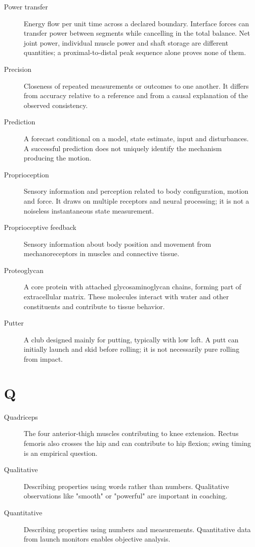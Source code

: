 \begin{description}
\item[Power transfer] Energy flow per unit time across a declared boundary. Interface forces can transfer power between segments while cancelling in the total balance. Net joint power, individual muscle power and shaft storage are different quantities; a proximal-to-distal peak sequence alone proves none of them.

\item[Precision] Closeness of repeated measurements or outcomes to one another. It differs from accuracy relative to a reference and from a causal explanation of the observed consistency.

\item[Prediction] A forecast conditional on a model, state estimate, input and disturbances. A successful prediction does not uniquely identify the mechanism producing the motion.

\item[Proprioception] Sensory information and perception related to body configuration, motion and force. It draws on multiple receptors and neural processing; it is not a noiseless instantaneous state measurement.

\item[Proprioceptive feedback] Sensory information about body position and movement from mechanoreceptors in muscles and connective tissue.

\item[Proteoglycan] A core protein with attached glycosaminoglycan chains, forming part of extracellular matrix. These molecules interact with water and other constituents and contribute to tissue behavior.

\item[Putter] A club designed mainly for putting, typically with low loft. A putt can initially launch and skid before rolling; it is not necessarily pure rolling from impact.

\end{description}
\section*{Q}
\begin{description}

\item[Quadriceps] The four anterior-thigh muscles contributing to knee extension. Rectus femoris also crosses the hip and can contribute to hip flexion; swing timing is an empirical question.

\item[Qualitative] Describing properties using words rather than numbers. Qualitative observations like "smooth" or "powerful" are important in coaching.

\item[Quantitative] Describing properties using numbers and measurements. Quantitative data from launch monitors enables objective analysis.

\end{description}
